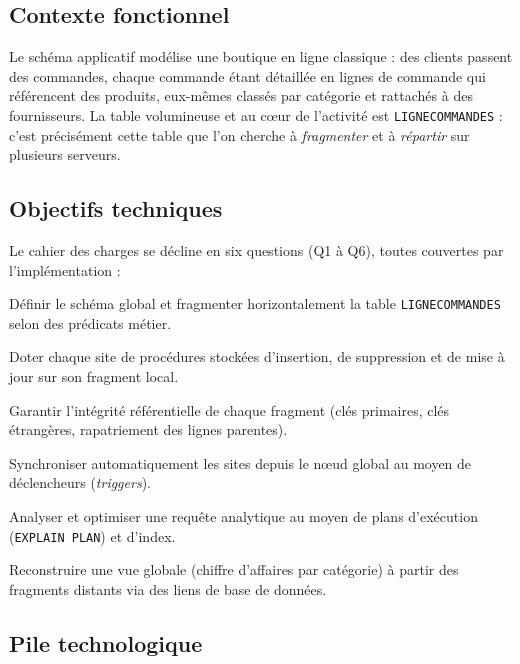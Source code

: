 \documentclass[11pt,a4paper]{article}
\begin{document}
\subsection{Contexte fonctionnel}

Le schéma applicatif modélise une boutique en ligne classique : des clients
passent des commandes, chaque commande étant détaillée en lignes de commande
qui référencent des produits, eux-mêmes classés par catégorie et rattachés à
des fournisseurs. La table volumineuse et au cœur de l'activité est
\texttt{LIGNECOMMANDES} : c'est précisément cette table que l'on cherche à
\emph{fragmenter} et à \emph{répartir} sur plusieurs serveurs.

\subsection{Objectifs techniques}

Le cahier des charges se décline en six questions (Q1 à Q6), toutes couvertes
par l'implémentation :

\begin{description}[leftmargin=2.2cm,style=nextline]
  \item[\textbf{Q1}] Définir le schéma global et fragmenter horizontalement la
    table \texttt{LIGNECOMMANDES} selon des prédicats métier.
  \item[\textbf{Q2}] Doter chaque site de procédures stockées d'insertion, de
    suppression et de mise à jour sur son fragment local.
  \item[\textbf{Q3}] Garantir l'intégrité référentielle de chaque fragment
    (clés primaires, clés étrangères, rapatriement des lignes parentes).
  \item[\textbf{Q4}] Synchroniser automatiquement les sites depuis le nœud
    global au moyen de déclencheurs (\emph{triggers}).
  \item[\textbf{Q5}] Analyser et optimiser une requête analytique au moyen de
    plans d'exécution (\texttt{EXPLAIN PLAN}) et d'index.
  \item[\textbf{Q6}] Reconstruire une vue globale (chiffre d'affaires par
    catégorie) à partir des fragments distants via des liens de base de
    données.
\end{description}

\subsection{Pile technologique}
\end{document}
